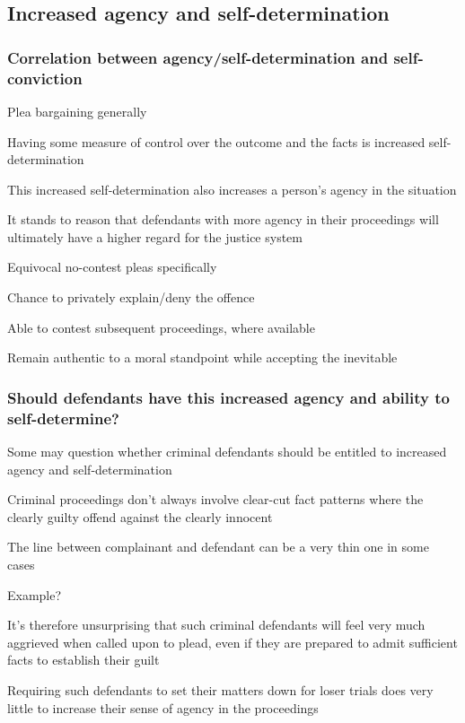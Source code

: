 \subsection{Increased agency and self-determination}

\subsubsection{Correlation between agency/self-determination and self-conviction}

Plea bargaining generally

Having some measure of control over the outcome and the facts is increased self-determination

This increased self-determination also increases a person's agency in the situation

It stands to reason that defendants with more agency in their proceedings will ultimately have a higher regard for the justice system

Equivocal no-contest pleas specifically

Chance to privately explain/deny the offence

Able to contest subsequent proceedings, where available

Remain authentic to a moral standpoint while accepting the inevitable

\subsubsection{Should defendants have this increased agency and ability to self-determine?}

Some may question whether criminal defendants should be entitled to increased agency and self-determination

Criminal proceedings don't always involve clear-cut fact patterns where the clearly guilty offend against the clearly innocent

The line between complainant and defendant can be a very thin one in some cases

Example?

It's therefore unsurprising that such criminal defendants will feel very much aggrieved when called upon to plead, even if they are prepared to admit sufficient facts to establish their guilt

Requiring such defendants to set their matters down for loser trials does very little to increase their sense of agency in the proceedings

